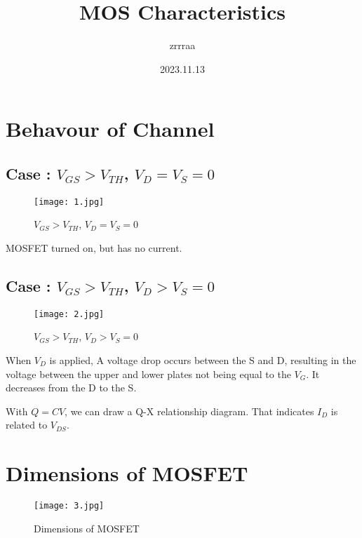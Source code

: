 \documentclass[fontset=windows]{article}
\title{\heiti\zihao{2} MOS Characteristics \uppercase\expandafter{\romannumeral1}}
\author{\songti zrrraa}
\date{2023.11.13}
\begin{document}
\maketitle
\thispagestyle{empty}

\section*{Behavour of Channel}

\subsection*{Case \uppercase\expandafter{}: $V_{GS}>V_{TH}$, $V_D=V_S=0$}

\begin{figure}[htbp]
    \centering
    \texttt{[image: 1.jpg]}
    \captionsetup{labelformat=empty}
    \caption{$V_{GS}>V_{TH}$, $V_D=V_S=0$}
    \label{1}
\end{figure}

MOSFET turned on, but has no current.

\subsection*{Case \uppercase\expandafter{}: $V_{GS}>V_{TH}$, $V_D>V_S=0$}

\begin{figure}[htbp]
    \centering
    \texttt{[image: 2.jpg]}
    \captionsetup{labelformat=empty}
    \caption{$V_{GS}>V_{TH}$, $V_D>V_S=0$}
    \label{2}
\end{figure}

When $V_D$ is applied, A voltage drop occurs between the S and D,
resulting in the voltage between the upper and lower plates not being equal to the $V_G$.
It decreases from the D to the S.

With $Q=CV$, we can draw a Q-X relationship diagram. That indicates $I_D$ is related to $V_{DS}$.

\section*{Dimensions of MOSFET}

\begin{figure}[htbp]
    \centering
    \texttt{[image: 3.jpg]}
    \captionsetup{labelformat=empty}
    \caption{Dimensions of MOSFET}
    \label{3}
\end{figure}
\end{document}
